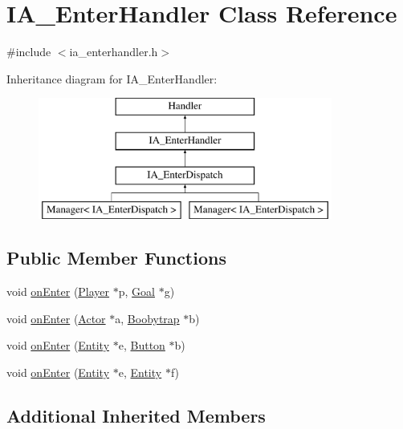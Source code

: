 \hypertarget{class_i_a___enter_handler}{\section{I\-A\-\_\-\-Enter\-Handler Class Reference}
\label{class_i_a___enter_handler}
}


{\ttfamily \#include $<$ia\-\_\-enterhandler.\-h$>$}

Inheritance diagram for I\-A\-\_\-\-Enter\-Handler\-:\begin{figure}[H]
\begin{center}
\leavevmode
\includegraphics[height=4.000000cm]{class_i_a___enter_handler}
\end{center}
\end{figure}
\subsection*{Public Member Functions}
\begin{DoxyCompactItemize}
\item 
void \hyperlink{class_i_a___enter_handler_a1eed327c0520e3e5352952be8db4e407}{on\-Enter} (\hyperlink{class_player}{Player} $\ast$p, \hyperlink{class_goal}{Goal} $\ast$g)
\item 
void \hyperlink{class_i_a___enter_handler_a49564d959017c61f4afbbfea7c5c3eeb}{on\-Enter} (\hyperlink{class_actor}{Actor} $\ast$a, \hyperlink{class_boobytrap}{Boobytrap} $\ast$b)
\item 
void \hyperlink{class_i_a___enter_handler_a340a0096594990ce52886393b98387b6}{on\-Enter} (\hyperlink{class_entity}{Entity} $\ast$e, \hyperlink{class_button}{Button} $\ast$b)
\item 
void \hyperlink{class_i_a___enter_handler_a42dd4db9a499f32fc3be9ae956e829c8}{on\-Enter} (\hyperlink{class_entity}{Entity} $\ast$e, \hyperlink{class_entity}{Entity} $\ast$f)
\end{DoxyCompactItemize}
\subsection*{Additional Inherited Members}



